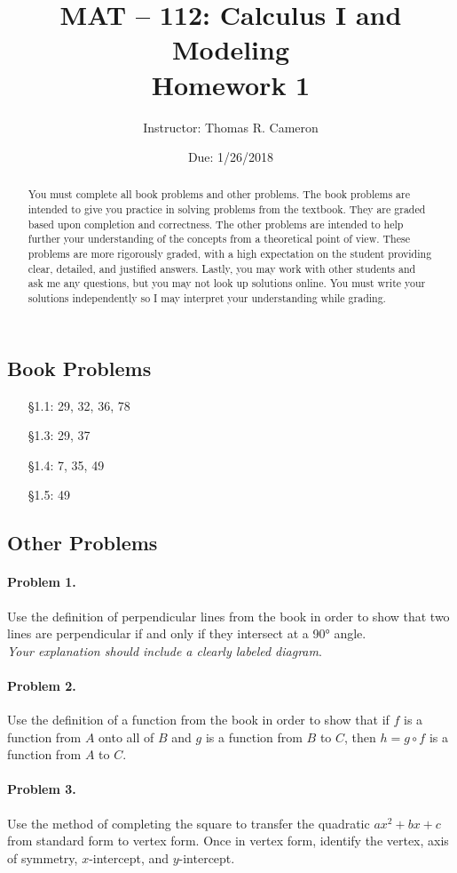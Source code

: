\documentclass{article}
\title{MAT -- 112: Calculus I and Modeling\\
\large{Homework 1}}
\author{Instructor: Thomas R. Cameron}
\date{Due: 1/26/2018}
\begin{document}
\maketitle

\begin{abstract}
You must complete all book problems and other problems. The book problems are intended to give you practice in solving problems from the textbook. They are graded based upon completion and correctness. The other problems are intended to help further your understanding of the concepts from a theoretical point of view. These problems are more rigorously graded, with a high expectation on the student providing clear, detailed, and justified answers. Lastly, you may work with other students and ask me any questions, but you may not look up solutions online. You must write your solutions independently so I may interpret your understanding while grading. 
\end{abstract}

\subsection*{Book Problems}
\begin{itemize}
\item   [\S 1.1:] 29, 32, 36, 78
\item   [\S 1.3:] 29, 37
\item   [\S 1.4:] 7, 35, 49
\item   [\S 1.5:] 49
\end{itemize}

\subsection*{Other Problems}

\paragraph*{Problem 1.}	Use the definition of perpendicular lines from the book in order to show that two lines are perpendicular if and only if they intersect at a \ang{90} angle.\\
\emph{Your explanation should include a clearly labeled diagram}. 

\paragraph*{Problem 2.}	Use the definition of a function from the book in order to show that if $f$ is a function from $A$ onto all of $B$ and $g$ is a function from $B$ to $C$, then $h=g\circ f$ is a function from $A$ to $C$.

\paragraph*{Problem 3.}	Use the method of completing the square to transfer the quadratic $ax^{2}+bx+c$ from standard form to vertex form. Once in vertex form, identify the vertex, axis of symmetry, $x$-intercept, and $y$-intercept.
\end{document}
